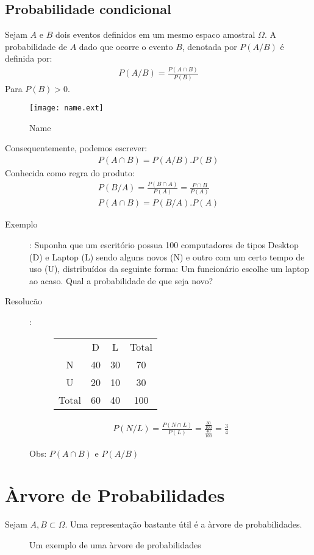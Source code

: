 \documentclass[11pt,a4paper]{book}
\begin{document}
\begin{description}
\subsection{Probabilidade condicional}
Sejam $A$ e $B$ dois eventos definidos em um mesmo espaco amostral $\Omega$.
A probabilidade de $A$  dado que ocorre o evento $B$, denotada por $P(A/B)$ é definida por:
\begin{align}
  P(A/B)= \frac{P(A\cap B)}{P(B)}
\end{align}
Para $P(B)>0$. 
\begin{figure}[htpb]
  \centering
  \texttt{[image: name.ext]}
  \caption{Name}
  \label{fig:16}
\end{figure}
Consequentemente, podemos escrever:
\begin{align}
  P(A\cap B)= P(A/B).P(B)
\end{align}
Conhecida como regra do produto:
\begin{align}
  P(B/A)= \frac{P(B \cap A)}{P(A)}= \frac{P\cap B}{P(A)}\\
  P(A \cap B)= P(B/A).P(A)
\end{align}
\begin{description}
  \item [Exemplo]: Suponha que um escritório possua 100 computadores de tipos Desktop (D) e 
Laptop (L) sendo alguns novos (N) e outro com um certo tempo de uso (U), distribuídos da seguinte forma:
Um funcionário escolhe um laptop ao acaso. Qual a probabilidade de que seja novo?

\item[Resolucão]: 
\begin{figure}[H] 
  \centering
  \begin{tabular}{c c c c}
    \toprule
    &D&L&Total\\ \cmidrule{2-4}
    N&40&30&70\\ \cmidrule{2-4}
    U&20&10&30\\ \cmidrule{2-4}
    Total&60&40&100 \\\bottomrule
  \end{tabular}
  \label{tab:2}
\end{figure}


\begin{align*}
  P(N/L)= \frac{P(N \cap L)}{P(L)}= \frac{\frac{30}{100}}{\frac{40}{100}}=\frac{3}{4}
\end{align*}

Obs: $P(A \cap B)$ e $P(A/B)$
\end{description}
\section{Àrvore de Probabilidades}
Sejam $A,B \subset \Omega$. Uma representação bastante útil é a àrvore de probabilidades.
\begin{description}
\begin{figure}
  \label{fig:17}
  \caption{Um exemplo de uma àrvore de probabilidades}
\end{figure}


\end{description}
\end{description}
\end{document}
